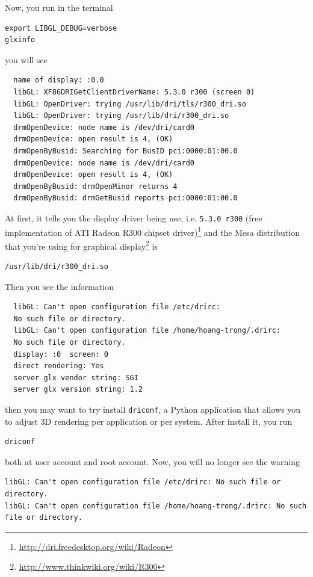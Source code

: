 Now, you run in the terminal
\begin{verbatim}
export LIBGL_DEBUG=verbose
glxinfo
\end{verbatim}
you will see

\begin{Verbatim}
  name of display: :0.0
  libGL: XF86DRIGetClientDriverName: 5.3.0 r300 (screen 0)
  libGL: OpenDriver: trying /usr/lib/dri/tls/r300_dri.so
  libGL: OpenDriver: trying /usr/lib/dri/r300_dri.so
  drmOpenDevice: node name is /dev/dri/card0
  drmOpenDevice: open result is 4, (OK)
  drmOpenByBusid: Searching for BusID pci:0000:01:00.0
  drmOpenDevice: node name is /dev/dri/card0
  drmOpenDevice: open result is 4, (OK)
  drmOpenByBusid: drmOpenMinor returns 4
  drmOpenByBusid: drmGetBusid reports pci:0000:01:00.0
\end{Verbatim}
At first, it tells you the display driver being use, i.e.
\verb!5.3.0 r300! (free implementation of ATI Radeon R300 chipset
driver)\footnote{\url{http://dri.freedesktop.org/wiki/Radeon}} and the
Mesa distribution that you're using for graphical
display\footnote{\url{http://www.thinkwiki.org/wiki/R300}} is
\begin{verbatim}
/usr/lib/dri/r300_dri.so
\end{verbatim}

\renewcommand{\FancyVerbFormatLine}[1]{%
  \ifnum\value{FancyVerbLine}<5\color{red}#1%
  \else\color{blue}#1\fi}

Then you see the information
\begin{Verbatim}
  libGL: Can't open configuration file /etc/drirc: 
  No such file or directory.
  libGL: Can't open configuration file /home/hoang-trong/.drirc: 
  No such file or directory.
  display: :0  screen: 0
  direct rendering: Yes
  server glx vendor string: SGI
  server glx version string: 1.2
\end{Verbatim}
then you may want to try install \verb!driconf!, a Python application
that allows you to adjust 3D rendering per application or per
system. After install it, you run
\begin{verbatim}
driconf
\end{verbatim}
both at user account and root account. Now, you will no longer see the
warning
\begin{verbatim}
libGL: Can't open configuration file /etc/drirc: No such file or directory.
libGL: Can't open configuration file /home/hoang-trong/.drirc: No such file or directory.
\end{verbatim}

